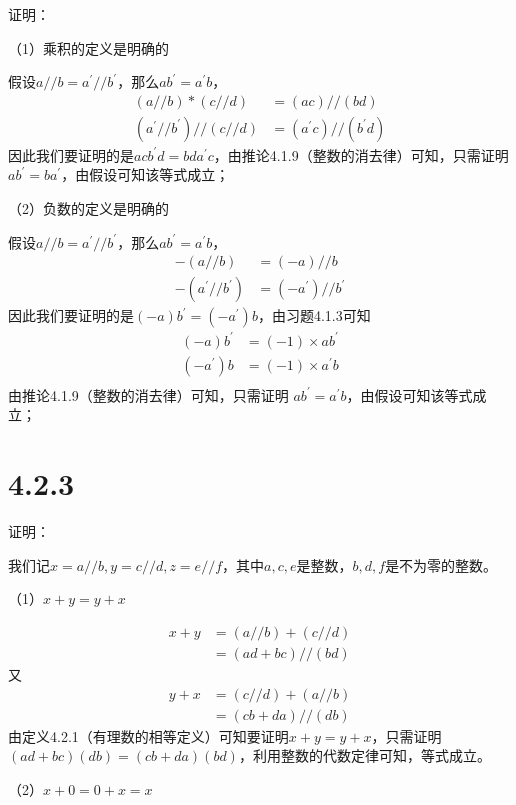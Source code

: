 \documentclass{article}
\theoremstyle{mystyle}
\begin{document}
证明：

（1）乘积的定义是明确的

假设$a // b = a^\prime // b^\prime$，那么$a b^\prime = a^\prime b$，
\begin{align}
  (a//b)*(c//d)                      & =(ac)//(bd)                    \\
  (a^\prime // b^\prime) // (c // d) & = (a^\prime c) // (b^\prime d)
\end{align}
因此我们要证明的是$acb^\prime d = bda^\prime c$，由推论4.1.9（整数的消去律）可知，只需证明
$ab^\prime = ba^\prime$，由假设可知该等式成立；

（2）负数的定义是明确的

假设$a // b = a^\prime // b^\prime$，那么$a b^\prime = a^\prime b$，
\begin{align}
  -(a//b)                 & = (-a)//b               \\
  -(a^\prime // b^\prime) & = (-a^\prime)//b^\prime
\end{align}
因此我们要证明的是$(-a)b^\prime = (-a^\prime)b $，由习题4.1.3可知
\begin{align*}
  (-a)b^\prime & =(-1)\times ab^\prime  \\
  (-a^\prime)b & =(-1)\times a^\prime b \\
\end{align*}
由推论4.1.9（整数的消去律）可知，只需证明
$ab^\prime = a^\prime b$，由假设可知该等式成立；


\section*{4.2.3}

证明：

我们记$x=a//b,y=c//d,z=e//f$，其中$a,c,e$是整数，$b,d,f$是不为零的整数。

（1）$x + y = y + x$

\begin{align*}
  x + y & = (a//b) + (c//d)   \\
        & = (ad + bc) // (bd)
\end{align*}
又
\begin{align*}
  y + x & = (c//d) + (a//b)   \\
        & = (cb + da) // (db)
\end{align*}
由定义4.2.1（有理数的相等定义）可知要证明$x+y=y+x$，只需证明
$(ad + bc)(db) = (cb + da) (bd)$，利用整数的代数定律可知，等式成立。

（2）$x + 0 = 0 + x = x$
\end{document}
